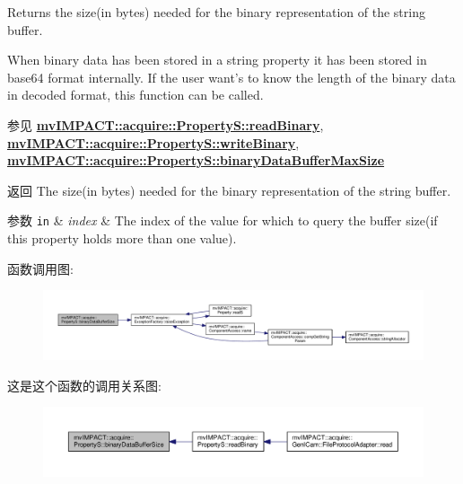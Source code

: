 Returns the size(in bytes) needed for the binary representation of the string buffer. 

When binary data has been stored in a string property it has been stored in base64 format internally. If the user want's to know the length of the binary data in decoded format, this function can be called.

\begin{DoxySeeAlso}{参见}
{\bfseries \hyperlink{classmv_i_m_p_a_c_t_1_1acquire_1_1_property_s_a29342383600102e22fd6e235fcd63728}{mv\+I\+M\+P\+A\+C\+T\+::acquire\+::\+Property\+S\+::read\+Binary}}, ~\newline
 {\bfseries \hyperlink{classmv_i_m_p_a_c_t_1_1acquire_1_1_property_s_ac08293bd5d249b57a66ea5d325c9a37a}{mv\+I\+M\+P\+A\+C\+T\+::acquire\+::\+Property\+S\+::write\+Binary}}, ~\newline
 {\bfseries \hyperlink{classmv_i_m_p_a_c_t_1_1acquire_1_1_property_s_a8d0247ac6a035407c0ba751bc23ac016}{mv\+I\+M\+P\+A\+C\+T\+::acquire\+::\+Property\+S\+::binary\+Data\+Buffer\+Max\+Size}} 
\end{DoxySeeAlso}
\begin{DoxyReturn}{返回}
The size(in bytes) needed for the binary representation of the string buffer. 
\end{DoxyReturn}

\begin{DoxyParams}[1]{参数}
\mbox{\tt in}  & {\em index} & The index of the value for which to query the buffer size(if this property holds more than one value). \\
\hline
\end{DoxyParams}


函数调用图\+:
\nopagebreak
\begin{figure}[H]
\begin{center}
\leavevmode
\includegraphics[width=350pt]{classmv_i_m_p_a_c_t_1_1acquire_1_1_property_s_a8fe526b2493641d5bdc79e20429f73c8_cgraph}
\end{center}
\end{figure}




这是这个函数的调用关系图\+:
\nopagebreak
\begin{figure}[H]
\begin{center}
\leavevmode
\includegraphics[width=350pt]{classmv_i_m_p_a_c_t_1_1acquire_1_1_property_s_a8fe526b2493641d5bdc79e20429f73c8_icgraph}
\end{center}
\end{figure}


